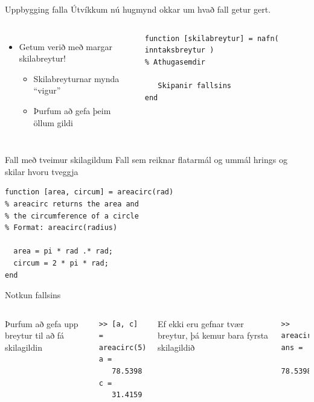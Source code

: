\documentclass[handout]{beamer}
\begin{document}
\begin{frame}[fragile]{Uppbygging falla}
\vspace{\baselineskip}
Útvíkkum nú hugmynd okkar um hvað fall getur gert.
\begin{columns}
\begin{itemize}
 \item Getum verið með margar skilabreytur!
 \begin{itemize}
  \item Skilabreyturnar mynda ``vigur''
  \item Þurfum að gefa þeim öllum gildi
 \end{itemize}
\end{itemize}
\begin{verbatim}
function [skilabreytur] = nafn( inntaksbreytur )
% Athugasemdir

   Skipanir fallsins
end 
\end{verbatim}
\end{columns}
\end{frame}

\begin{frame}[fragile]{Fall með tveimur skilagildum}
\vspace{\baselineskip}
Fall sem reiknar flatarmál og ummál hrings og skilar hvoru tveggja
\begin{verbatim}
function [area, circum] = areacirc(rad)
% areacirc returns the area and 
% the circumference of a circle
% Format: areacirc(radius)
    
  area = pi * rad .* rad;
  circum = 2 * pi * rad;
end
\end{verbatim}
\end{frame}

\begin{frame}[fragile]{Notkun fallsins}
\begin{columns}
Þurfum að gefa upp breytur til að fá skilagildin
\begin{verbatim}
>> [a, c] = areacirc(5)
a =
   78.5398
c =
   31.4159
\end{verbatim}
Ef ekki eru gefnar tvær breytur, þá kemur bara fyrsta skilagildið
\begin{verbatim}
>> areacirc(5)
ans =
   78.5398
\end{verbatim}
\end{columns}
\end{frame}
\end{document}
